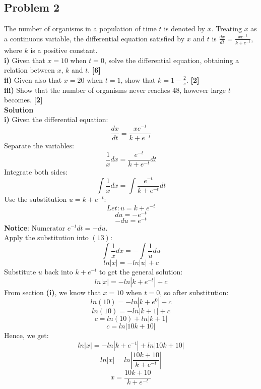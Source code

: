\documentclass[hidelinks, a4paper, 12pt]{article}
\begin{document}
        \subsection{Problem 2}
            The number of organisms in a population of time $t$ is denoted by $x$. Treating $x$ as
            a continuous variable, the differential equation satisfied by $x$ and $t$ is $\frac{dx}{dt}=\frac{xe^{-t}}{k+e^{-t}}$, where $k$ is a
            positive constant.\\[\baselineskip]
            \textbf{i)} Given that $x = 10$ when $t = 0$, solve the differential equation, obtaining a relation between $x$, $k$ and $t$. \textbf{[6]}\\[\baselineskip]
            \textbf{ii)} Given also that $x = 20$ when $t = 1$, show that $k = 1 - \frac{2}{e}$. \textbf{[2]}\\[\baselineskip]
            \textbf{iii)} Show that the number of organisms never reaches 48, however large $t$ becomes. \textbf{[2]}\\[\baselineskip]
            \textbf{Solution}\\[\baselineskip]
            \textbf{i)} Given the differential equation:
            \[\frac{dx}{dt}=\frac{xe^{-t}}{k+e^{-t}}\]
            Separate the variables:
            \[\frac{1}{x}dx=\frac{e^{-t}}{k+e^{-t}}dt\]
            Integrate both sides:
            \begin{equation}
                \int \frac{1}{x}dx=\int \frac{e^{-t}}{k+e^{-t}}dt
            \end{equation}
            Use the substitution $u = k + e^{-t}$:
            \[Let: u = k + e^{-t}\]
            \[du = -e^{-t}\]
            \[-du = e^{-t}\]
            \textbf{Notice}: Numerator $e^{-t}dt = -du$.\\
            Apply the substitution into $(13)$:
            \[\int \frac{1}{x}dx=-\int \frac{1}{u}du\]
            \[ln|x| = -ln|u| + c\]
            Substitute $u$ back into $k + e^{-t}$ to get the general solution:
            \[ln|x| = -ln|k + e^{-t}| + c\]
            From section \textbf{(i)}, we know that $x = 10$ when $t = 0$, so after substitution:
            \[ln(10) = -ln|k+e^0| + c\]
            \[ln(10) = -ln|k+1| + c\]
            \[c = ln(10) + ln|k+1|\]
            \[c = ln|10k + 10|\]
            Hence, we get:
            \[ln|x| = -ln|k + e^{-t}| + ln|10k + 10|\]
            \[ln|x| = ln|\frac{10k+10}{k + e^{-t}}|\]
            \begin{equation}
                x = \frac{10k+10}{k + e^{-t}}
            \end{equation}
\end{document}
